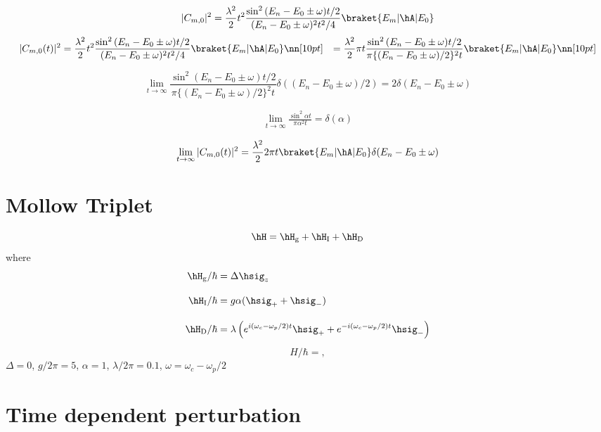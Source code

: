 \begin{align}
    |C_{m,0}|^2=\frac{\lambda^2}{2}
    t^2  \frac{\sin^2{(E_n-E_0\pm\omega)t/2}}{(E_n-E_0\pm\omega)^2t^2/4}\braket{E_m|\hA|E_0}
\end{align}
\begin{align}
    |C_{m,0}(t)|^2&=\frac{\lambda^2}{2}
    t^2  \frac{\sin^2{(E_n-E_0\pm\omega)t/2}}{(E_n-E_0\pm\omega)^2t^2/4}\braket{E_m|\hA|E_0}\nn[10pt]
    &=\frac{\lambda^2}{2}
    \pi t  \frac{\sin^2{(E_n-E_0\pm\omega)t/2}}{\pi\{(E_n-E_0\pm\omega)/2\}^2t}\braket{E_m|\hA|E_0}\nn[10pt]
\end{align}

\begin{equation}
    \lim_{t\to\infty}\frac{\sin^2{(E_n-E_0\pm\omega)t/2}}{\pi\{(E_n-E_0\pm\omega)/2\}^2t}
    \delta((E_n-E_0\pm\omega)/2)=2\delta(E_n-E_0\pm\omega)
\end{equation}

\begin{align}
    \lim_{t\to\infty}\frac{\sin^2{\alpha t}}{\pi\alpha^2 t}=\delta(\alpha)
\end{align}


\begin{equation}
    \lim_{t\to\infty}|C_{m,0}(t)|^2
    =\frac{\lambda^2}{2}
    2\pi t \braket{E_m|\hA|E_0}
    \delta(E_n-E_0\pm\omega)
\end{equation}


\section{Mollow Triplet}
\begin{equation}
    \hH=\hH_{\rm{g}}+\hH_{\rm{I}}+\hH_{\rm{D}}    
\end{equation}
where
\begin{align}
    \hH_{\rm{g}}/\hbar&=\Delta\hsig_z\\[10pt]
    \hH_{\rm{I}}/\hbar&=g\alpha(\hsig_{+}+\hsig_{-})\\[10pt]
    \hH_{\rm{D}}/\hbar&=\lambda\left(e^{i(\omega_c-\omega_p/2)t}\hsig_{+}+e^{-i(\omega_c-\omega_p/2)t}\hsig_{-}\right)
\end{align}
\begin{equation}
\hat{H}/\hbar = ,
\end{equation}
$\Delta=0$, $g/2\pi=5$, $\alpha=1$, $\lambda/2\pi=0.1$, $\omega=\omega_c-\omega_p/2$


\section{Time dependent perturbation}

